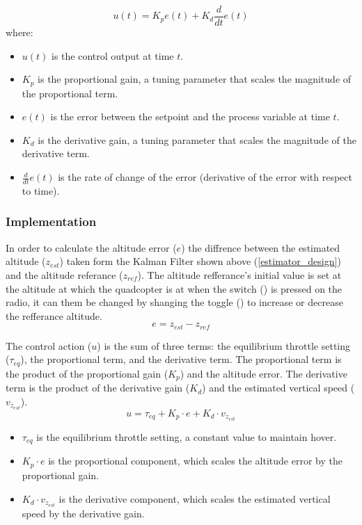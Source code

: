 \documentclass{article}
\begin{document}
\begin{equation}
  u(t) = K_p e(t) + K_d \frac{d}{dt} e(t)
\end{equation}
where:
\begin{itemize}
  \item $u(t)$ is the control output at time $t$.
  \item $K_p$ is the proportional gain, a tuning parameter that scales the
  magnitude of the proportional term.
  \item $e(t)$ is the error between the setpoint and the process variable at
  time $t$.
  \item $K_d$ is the derivative gain, a tuning parameter that scales the
  magnitude of the derivative term.
  \item $\frac{d}{dt} e(t)$ is the rate of change of the error (derivative of
  the error with respect to time).
\end{itemize}

\subsubsection*{Implementation}
In order to calculate the altitude error (\(e\)) the diffrence between the
estimated altitude (\(z_{est}\)) taken form the Kalman Filter shown above
(\ref{estimator_design}) and the altitude referance (\(z_{ref}\)). The altitude
refferance's initial value is set at the altitude at which the quadcopter is at
when the switch () is pressed on the radio, it can them be changed by shanging
the toggle () to increase or decrease the refferance altitude.
\begin{equation}
  e = z_{est} - z_{ref}
\end{equation}

The control action (\(u\)) is the sum of three terms: the equilibrium throttle
setting (\(\tau_{eq}\)), the proportional term, and the derivative term. The
proportional term is the product of the proportional gain (\(K_p\)) and the
altitude error. The derivative term is the product of the derivative gain
(\(K_d\)) and the estimated vertical speed (\(v_{z_{est}}\)).
\begin{equation}\label{PD_controller_eq}
  u = \tau_{eq} + K_p \cdot e + K_d \cdot v_{z_{est}}
\end{equation}
\begin{itemize}
  \item \(\tau_{eq}\) is the equilibrium throttle setting, a constant value to
  maintain hover.
  \item \(K_p \cdot e\) is the proportional component, which scales the altitude
  error by the proportional gain.
  \item \(K_d \cdot v_{z_{est}}\) is the derivative component, which scales the
  estimated vertical speed by the derivative gain.
\end{itemize}
\end{document}
